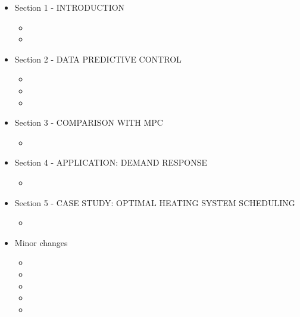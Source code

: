 \documentclass{article}
\begin{document}
\begin{itemize}

	\item Section 1 - INTRODUCTION

	\begin{itemize}

		\item 

		\item 

	\end{itemize}

	\item Section 2 - DATA PREDICTIVE CONTROL

	\begin{itemize}

		\item 

		\item 

		\item 

	\end{itemize}

	\item Section 3 - COMPARISON WITH MPC

	\begin{itemize}

		\item 

	\end{itemize}

	\item Section 4 - APPLICATION: DEMAND RESPONSE

	\begin{itemize}

		\item 

	\end{itemize}

	\item Section 5 - CASE STUDY: OPTIMAL HEATING SYSTEM SCHEDULING

	\begin{itemize}

		\item 

	\end{itemize}

	\item Minor changes

	\begin{itemize}

		\item 

		\item 

		\item 

		\item 

		\item 

	\end{itemize}

\end{itemize}
\end{document}
